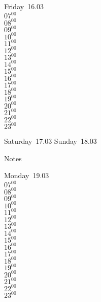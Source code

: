 \documentclass[11pt, a4paper]{book}\usepackage[]{graphicx}\usepackage[]{color}
\begin{document}
\begin{weekdaybox}
  Friday~16.03\\
  { 
  \vfill
  $07^{00}$\\
$08^{00}$\\
$09^{00}$\\
$10^{00}$\\
$11^{00}$\\
$12^{00}$\\
$13^{00}$\\
$14^{00}$\\
$15^{00}$\\
$16^{00}$\\
$17^{00}$\\
$18^{00}$\\
$19^{00}$\\
$20^{00}$\\
$21^{00}$\\
$22^{00}$\\
$23^{00}$\\
  }
\end{weekdaybox}
\begin{weekendbox}
  Saturday~17.03
  \tcblower
  Sunday~18.03
\end{weekendbox} %
\begin{notebox}
  Notes
\end{notebox}
\clearpage
\begin{headerbox}
\end{headerbox}
\begin{weekdaybox}
  Monday~19.03\\
  { 
  \vfill
  $07^{00}$\\
$08^{00}$\\
$09^{00}$\\
$10^{00}$\\
$11^{00}$\\
$12^{00}$\\
$13^{00}$\\
$14^{00}$\\
$15^{00}$\\
$16^{00}$\\
$17^{00}$\\
$18^{00}$\\
$19^{00}$\\
$20^{00}$\\
$21^{00}$\\
$22^{00}$\\
$23^{00}$\\
  }
\end{weekdaybox}
\end{document}

